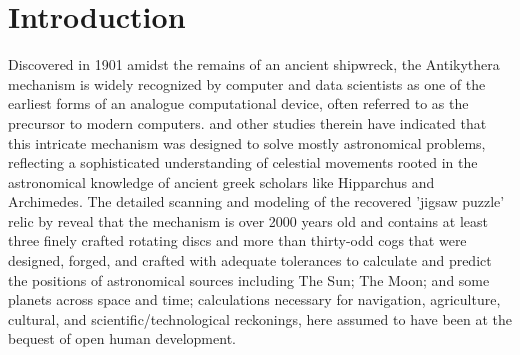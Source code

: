 \documentclass[final,5p,times,twocolumn,authoryear]{elsarticle}
\begin{document}

    

\section{Introduction}
\label{sec:intro}
%
Discovered in 1901 amidst the remains of an ancient shipwreck, the Antikythera mechanism is widely recognized by computer and data scientists as one of the earliest forms of an analogue computational device, often referred to as the precursor to modern computers. \cite{Freeth2021} and other studies therein have indicated that this intricate mechanism was designed to solve mostly astronomical problems, reflecting a sophisticated understanding of celestial movements rooted in the astronomical knowledge of ancient greek scholars like Hipparchus and Archimedes. The detailed scanning and modeling of the recovered 'jigsaw puzzle' relic by \cite{Freeth2021} reveal that the mechanism is over 2000 years old and contains at least three finely crafted rotating discs and more than thirty-odd cogs that were designed, forged, and crafted with adequate tolerances to calculate and predict the positions of astronomical sources including The Sun; The Moon; and some planets across space and time; calculations necessary for navigation, agriculture, cultural, and scientific/technological reckonings, here assumed to have been at the bequest of open human development.
 
\end{document}
